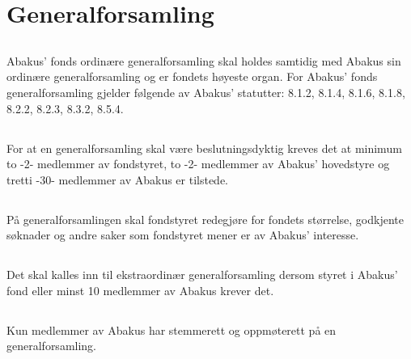 \section{Generalforsamling}

\subsection{}
Abakus’ fonds ordinære generalforsamling skal holdes samtidig med Abakus sin
ordinære generalforsamling og er fondets høyeste organ. For Abakus’ fonds
generalforsamling gjelder følgende av Abakus’ statutter: 8.1.2, 8.1.4, 8.1.6,
8.1.8, 8.2.2, 8.2.3, 8.3.2, 8.5.4.

\subsection{}
For at en generalforsamling skal være beslutningsdyktig kreves det at minimum
to -2- medlemmer av fondstyret, to -2- medlemmer av Abakus’ hovedstyre og tretti
-30- medlemmer av Abakus er tilstede.

\subsection{}
På generalforsamlingen skal fondstyret redegjøre for fondets størrelse,
godkjente søknader og andre saker som fondstyret mener er av Abakus’
interesse.

\subsection{}
Det skal kalles inn til ekstraordinær generalforsamling dersom styret i
Abakus’ fond eller minst 10 medlemmer av Abakus krever det.

\subsection{}
Kun medlemmer av Abakus har stemmerett og oppmøterett på en generalforsamling.
